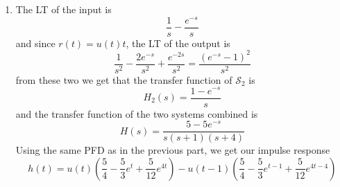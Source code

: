 \documentclass[12pt]{article}
\begin{document}
\begin{enumerate}
\begin{enumerate}
                  \item The LT of the input is
                        \[\frac{1}{s}-\frac{e^{-s}}{s}\]
                        and since $r(t)=u(t)t$, the LT of the output is
                        \[\frac{1}{s^2}-\frac{2e^{-s}}{s^2}+\frac{e^{-2s}}{s^2}
                              =\frac{\left(e^{-s}-1\right)^2}{s^2}\]
                        from these two we get that the transfer function of $\mathcal{S}_2$ is
                        \[H_2(s)=\frac{1-e^{-s}}{s}\]
                        and the transfer function of the two systems combined is
                        \[H(s)=\frac{5-5e^{-s}}{s(s+1)(s+4)}\]
                        Using the same PFD as in the previous part, we get our impulse response
                        \[\boxed{h(t)=u(t)\left(\frac{5}{4}-\frac{5}{3}e^t+\frac{5}{12}e^{4t}\right)
                        -u(t-1)\left(\frac{5}{4}-\frac{5}{3}e^{t-1}+\frac{5}{12}e^{4t-4}\right)}\]
            \end{enumerate}
\end{enumerate}
\end{document}
